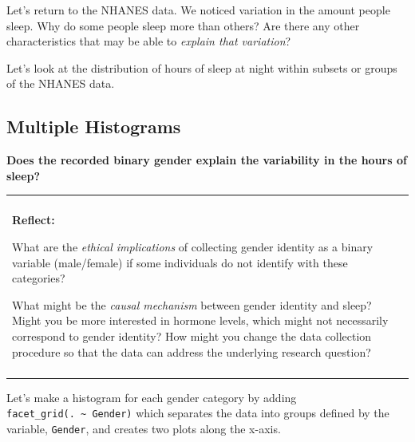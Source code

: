 \documentclass[]{book}
\newenvironment{Shaded}{\begin{snugshade}}{\end{snugshade}}
\newcommand{\DataTypeTok}[1]{\textcolor[rgb]{0.13,0.29,0.53}{#1}}
\newcommand{\DecValTok}[1]{\textcolor[rgb]{0.00,0.00,0.81}{#1}}
\newcommand{\KeywordTok}[1]{\textcolor[rgb]{0.13,0.29,0.53}{\textbf{#1}}}
\newcommand{\NormalTok}[1]{#1}
\newcommand{\OperatorTok}[1]{\textcolor[rgb]{0.81,0.36,0.00}{\textbf{#1}}}
\newcommand{\StringTok}[1]{\textcolor[rgb]{0.31,0.60,0.02}{#1}}
\newenvironment{reflect}
{
    \begin{center}
    
    \begin{tabular}{|p{0.8\textwidth}|}
    \rowcolor{LightBlue}
    \hline\\
    \rowcolor{LightBlue}
    \textbf{Reflect:}
}
{
    \\\rowcolor{LightBlue}
    \\\hline
    \end{tabular} 
    \end{center}
}
\begin{document}
Let's return to the NHANES data. We noticed variation in the amount people sleep. Why do some people sleep more than others? Are there any other characteristics that may be able to \emph{explain that variation}?

Let's look at the distribution of hours of sleep at night within subsets or groups of the NHANES data.

\hypertarget{multiple-histograms}{%
\subsection{Multiple Histograms}\label{multiple-histograms}}

\textbf{Does the recorded binary gender explain the variability in the hours of sleep?}

\begin{reflect}
What are the \emph{ethical implications} of collecting gender identity
as a binary variable (male/female) if some individuals do not identify
with these categories?

What might be the \emph{causal mechanism} between gender identity and
sleep? Might you be more interested in hormone levels, which might not
necessarily correspond to gender identity? How might you change the data
collection procedure so that the data can address the underlying
research question?
\end{reflect}

Let's make a histogram for each gender category by adding \texttt{facet\_grid(.\ \textasciitilde{}\ Gender)} which separates the data into groups defined by the variable, \texttt{Gender}, and creates two plots along the x-axis.

\begin{Shaded}
\end{Shaded}
\end{document}

